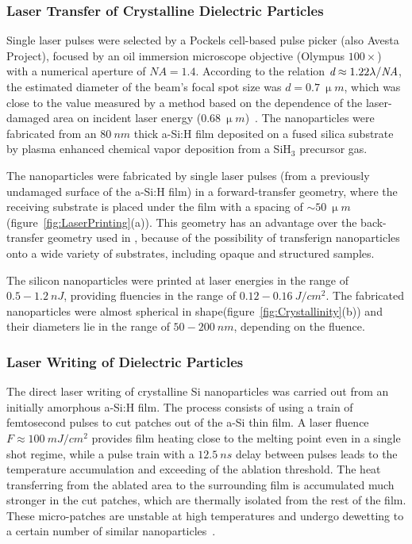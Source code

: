         \subsubsection{Laser Transfer of Crystalline Dielectric Particles}
                Single laser pulses were selected by a Pockels cell-based pulse picker (also Avesta Project),
            focused by an oil immersion microscope objective (Olympus $100\times$)
            with a numerical aperture of $\mathit{NA}=1.4$. According to the relation $\emph{d}\approx 1.22\lambda/\mathit{NA}$, the estimated
            diameter of the beam's focal spot size was $d=0.7~\si{\upmu m}$, which was close to the value measured by a method based on
            the dependence of the laser-damaged area on incident laser energy ($0.68~\si{\upmu m}$)~\cite{liu1982simple}.
            The nanoparticles were fabricated from an $80~\si{nm}$ thick a-Si:H film deposited on a fused silica substrate by
            plasma enhanced chemical vapor deposition from a SiH$_{3}$ precursor gas.

                The nanoparticles were fabricated by single laser pulses (from a previously undamaged surface of the a-Si:H film) in a
            forward-transfer geometry, where the receiving substrate is placed under the film with a spacing
            of $\sim 50~\si{\upmu m}$ (figure~\ref{fig:LaserPrinting}(a)). This geometry has an advantage over the back-transfer geometry
            used in \cite{zywietz2014laser}, because of the possibility of transferign nanoparticles onto a wide variety of substrates,
            including opaque and structured samples.

                The silicon nanoparticles were printed at laser energies in the range of $0.5-1.2~\si{nJ}$, providing fluencies in
            the range of $0.12-0.16~\si{J/cm^{2}}$. The fabricated nanoparticles were almost spherical in shape(figure~\ref{fig:Crystallinity}(b))
            and their diameters lie in the range of $50-200~\si{nm}$, depending on the fluence.

        \subsubsection{Laser Writing of Dielectric Particles}
                The direct laser writing of crystalline Si nanoparticles was carried out from an initially amorphous a-Si:H film.
            The process consists of using a train of femtosecond pulses to cut patches out of the a-Si thin film\cite{makarov2016controllable,
            dmitriev2016direct}. A laser fluence $F\approx100~\si{mJ/cm^{2}}$ provides film heating close to the melting point even in a
            single shot regime, while a pulse train with a $12.5~\si{ns}$ delay between pulses leads to the temperature accumulation
            and exceeding of the ablation threshold. The heat transferring from the ablated area to the surrounding film is accumulated
            much stronger in the cut patches, which are thermally isolated from the rest of the film.
            These micro-patches are unstable at high temperatures and undergo dewetting to a certain number of similar
            nanoparticles~\cite{thompson2012solid}.


